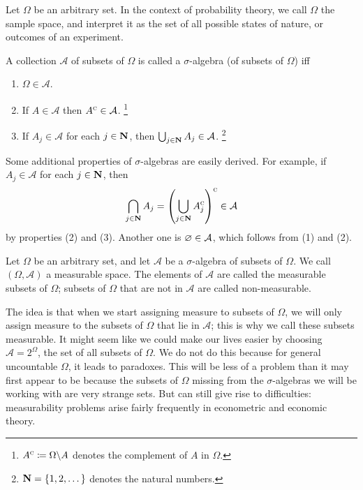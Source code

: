 \documentclass[11pt,letterpaper,reqno,oneside]{article}
\begin{document}
Let $\Omega$ be an arbitrary set. In the context of probability theory, we call $\Omega$ the sample space, and interpret it as the set of all possible states of nature, or outcomes of an experiment.
%
\begin{definition}
	A collection $\mathcal{A}$ of subsets of $\Omega$ is called a $\sigma$-algebra (of subsets of $\Omega$) iff
	\begin{enumerate}

		\item $\Omega \in \mathcal{A}$.

		\item If $A \in \mathcal{A}$ then $A^{\textsc{c}} \in \mathcal{A}$.%
			\footnote{$A^{\textsc{c}} \coloneqq \Omega \backslash A$ denotes the complement of $A$ in $\Omega$.}

		\item If $A_j \in \mathcal{A}$ for each $j \in \mathbf{N}$, then $\bigcup_{j \in \mathbf{N}} A_j \in \mathcal{A}$.%
			\footnote{$\mathbf{N} = \{1,2,\dots\}$ denotes the natural numbers.}

	\end{enumerate}
\end{definition}



Some additional properties of $\sigma$-algebras are easily derived. For example, if $A_j \in \mathcal{A}$ for each $j \in \mathbf{N}$, then
%
\begin{equation*}
	\bigcap_{j \in \mathbf{N}} A_j
	= \left( \bigcup_{j \in \mathbf{N}} A_j^{\textsc{c}} \right)^{\textsc{c}} 
	\in \mathcal{A}
\end{equation*}
%
by properties (2) and (3). Another one is $\varnothing \in \mathcal{A}$, which follows from (1) and (2).


\begin{definition}
	Let $\Omega$ be an arbitrary set, and let $\mathcal{A}$ be a $\sigma$-algebra of subsets of $\Omega$. We call $(\Omega,\mathcal{A})$ a measurable space. The elements of $\mathcal{A}$ are called the measurable subsets of $\Omega$; subsets of $\Omega$ that are not in $\mathcal{A}$ are called non-measurable.
\end{definition}

The idea is that when we start assigning measure to subsets of $\Omega$, we will only assign measure to the subsets of $\Omega$ that lie in $\mathcal{A}$; this is why we call these subsets measurable. It might seem like we could make our lives easier by choosing $\mathcal{A}=2^\Omega$, the set of all subsets of $\Omega$. We do not do this because for general uncountable $\Omega$, it leads to paradoxes. This will be less of a problem than it may first appear to be because the subsets of $\Omega$ missing from the $\sigma$-algebras we will be working with are very strange sets. But can still give rise to difficulties: measurability problems arise fairly frequently in econometric and economic theory.
\end{document}
